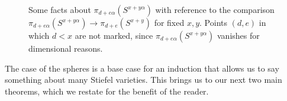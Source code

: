 \documentclass[11pt, oneside, dvipsnames, svgnames, table, final]{amsart}
\newcommand{\mathbx}[1]{\mathbb{#1}}
\theoremstyle{plain}
\newtheorem{theorem}[thm]{Theorem}
\theoremstyle{definition}
\theoremstyle{remark}
\newtheorem{remark}[thm]{Remark}
\newcommand{\C}{\mathbx{C}}
\newcommand{\Z}{\mathbx{Z}}
\newcommand{\A}{\mathbx{A}}
\newcommand{\M}{\mathsf{M}}
\newcommand{\isom}{\cong}
\newcommand{\iso}{\isom}
\newcommand{\mto}[1]{\stackrel{#1}{\longrightarrow}}
\newcommand{\isomto}{\mto{\isom}}
\newcommand{\MW}{\mathsf{MW}}
\newcommand{\K}{{{\mathbf K}}}
\newcommand{\<}[1]{{\langle}#1 {\rangle}}
\newcommand{\benw}[2][]{\ifdraft{\todo[linecolor=Green,backgroundcolor=Green!25,bordercolor=Green,#1]{#2---Ben W.}}{}}
\newcommand{\SpS}{\mathbb{S}}
\begin{document}
\begin{figure}
\caption{Some facts about $\pi_{d+e\alpha}(S^{x+y\alpha})$ with reference to the comparison $\pi_{d+e\alpha}(S^{x+y\alpha}) \to \pi_{d+e}(S^{x+y})$ for fixed $x,y$. Points $(d,e)$ in which $d < x$ are not marked, since $\pi_{d+e\alpha}(S^{x+y\alpha})$ vanishes for dimensional reasons.}
\label{fig:chart}
\end{figure}





The case of the spheres is a base case for an induction that allows us to say something about many Stiefel varieties. This brings us to our next two main theorems, which we restate for the benefit of the reader.
\surjectivityStiefel*
\end{document}
